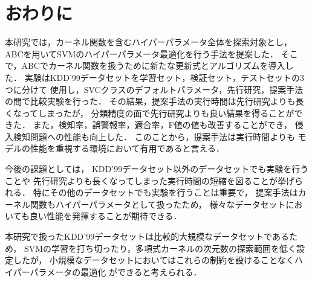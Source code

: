 \section{おわりに}
本研究では，カーネル関数を含むハイパーパラメータ全体を探索対象とし，
ABCを用いてSVMのハイパーパラメータ最適化を行う手法を提案した．
そこで，ABCでカーネル関数を扱うために新たな更新式とアルゴリズムを導入した．
実験はKDD'99データセットを学習セット，検証セット，テストセットの3つに分けて
使用し，SVCクラスのデフォルトパラメータ，先行研究，提案手法の間で比較実験を行った．
その結果，提案手法の実行時間は先行研究よりも長くなってしまったが，
分類精度の面で先行研究よりも良い結果を得ることができた．
また，検知率，誤警報率，適合率，F値の値も改善することができ，
侵入検知問題への性能も向上した．
このことから，提案手法は実行時間よりも
モデルの性能を重視する環境において有用であると言える．

今後の課題としては， KDD'99データセット以外のデータセットでも実験を行うことや
先行研究よりも長くなってしまった実行時間の短縮を図ることが挙げられる．
特にその他のデータセットでも実験を行うことは重要で，
提案手法はカーネル関数もハイパーパラメータとして扱ったため，
様々なデータセットにおいても良い性能を発揮することが期待できる．

本研究で扱ったKDD'99データセットは比較的大規模なデータセットであるため，
SVMの学習を打ち切ったり，多項式カーネルの次元数の探索範囲を低く設定したが，
小規模なデータセットにおいてはこれらの制約を設けることなくハイパーパラメータの最適化
ができると考えられる．






